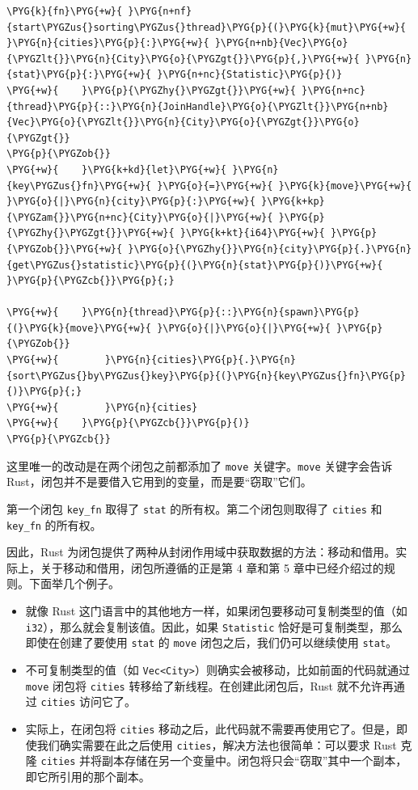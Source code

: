 \begin{Verbatim}[commandchars=\\\{\},breaklines=true,breakanywhere=true,fontsize=\codefont,xleftmargin=17bp]
\PYG{k}{fn}\PYG{+w}{ }\PYG{n+nf}{start\PYGZus{}sorting\PYGZus{}thread}\PYG{p}{(}\PYG{k}{mut}\PYG{+w}{ }\PYG{n}{cities}\PYG{p}{:}\PYG{+w}{ }\PYG{n+nb}{Vec}\PYG{o}{\PYGZlt{}}\PYG{n}{City}\PYG{o}{\PYGZgt{}}\PYG{p}{,}\PYG{+w}{ }\PYG{n}{stat}\PYG{p}{:}\PYG{+w}{ }\PYG{n+nc}{Statistic}\PYG{p}{)}
\PYG{+w}{    }\PYG{p}{\PYGZhy{}\PYGZgt{}}\PYG{+w}{ }\PYG{n+nc}{thread}\PYG{p}{::}\PYG{n}{JoinHandle}\PYG{o}{\PYGZlt{}}\PYG{n+nb}{Vec}\PYG{o}{\PYGZlt{}}\PYG{n}{City}\PYG{o}{\PYGZgt{}}\PYG{o}{\PYGZgt{}}
\PYG{p}{\PYGZob{}}
\PYG{+w}{    }\PYG{k+kd}{let}\PYG{+w}{ }\PYG{n}{key\PYGZus{}fn}\PYG{+w}{ }\PYG{o}{=}\PYG{+w}{ }\PYG{k}{move}\PYG{+w}{ }\PYG{o}{|}\PYG{n}{city}\PYG{p}{:}\PYG{+w}{ }\PYG{k+kp}{\PYGZam{}}\PYG{n+nc}{City}\PYG{o}{|}\PYG{+w}{ }\PYG{p}{\PYGZhy{}\PYGZgt{}}\PYG{+w}{ }\PYG{k+kt}{i64}\PYG{+w}{ }\PYG{p}{\PYGZob{}}\PYG{+w}{ }\PYG{o}{\PYGZhy{}}\PYG{n}{city}\PYG{p}{.}\PYG{n}{get\PYGZus{}statistic}\PYG{p}{(}\PYG{n}{stat}\PYG{p}{)}\PYG{+w}{ }\PYG{p}{\PYGZcb{}}\PYG{p}{;}

\PYG{+w}{    }\PYG{n}{thread}\PYG{p}{::}\PYG{n}{spawn}\PYG{p}{(}\PYG{k}{move}\PYG{+w}{ }\PYG{o}{|}\PYG{o}{|}\PYG{+w}{ }\PYG{p}{\PYGZob{}}
\PYG{+w}{        }\PYG{n}{cities}\PYG{p}{.}\PYG{n}{sort\PYGZus{}by\PYGZus{}key}\PYG{p}{(}\PYG{n}{key\PYGZus{}fn}\PYG{p}{)}\PYG{p}{;}
\PYG{+w}{        }\PYG{n}{cities}
\PYG{+w}{    }\PYG{p}{\PYGZcb{}}\PYG{p}{)}
\PYG{p}{\PYGZcb{}}
\end{Verbatim}

这里唯一的改动是在两个闭包之前都添加了 \texttt{move} 关键字。\texttt{move} 关键字会告诉 Rust，闭包并不是要借入它用到的变量，而是要“窃取”它们。

第一个闭包 \texttt{key\_fn} 取得了 \texttt{stat} 的所有权。第二个闭包则取得了 \texttt{cities} 和 \texttt{key\_fn} 的所有权。

因此，Rust 为闭包提供了两种从封闭作用域中获取数据的方法：移动和借用。实际上，关于移动和借用，闭包所遵循的正是第 4 章和第 5 章中已经介绍过的规则。下面举几个例子。

\begin{itemize}
\item 就像 Rust 这门语言中的其他地方一样，如果闭包要移动可复制类型的值（如 \texttt{i32}），那么就会复制该值。因此，如果 \texttt{Statistic} 恰好是可复制类型，那么即使在创建了要使用 \texttt{stat} 的 \texttt{move} 闭包之后，我们仍可以继续使用 \texttt{stat}。
\item 不可复制类型的值（如 \texttt{Vec<City>}）则确实会被移动，比如前面的代码就通过 \texttt{move} 闭包将 \texttt{cities} 转移给了新线程。在创建此闭包后，Rust 就不允许再通过 \texttt{cities} 访问它了。
\item 实际上，在闭包将 \texttt{cities} 移动之后，此代码就不需要再使用它了。但是，即使我们确实需要在此之后使用 \texttt{cities}，解决方法也很简单：可以要求 Rust 克隆 \texttt{cities} 并将副本存储在另一个变量中。闭包将只会“窃取”其中一个副本，即它所引用的那个副本。
\end{itemize}

